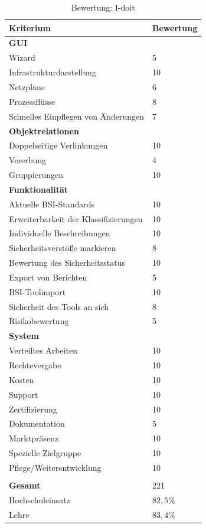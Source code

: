 \begin{table}[h]
\begin{tabular}{|p{}|p{}|}
\hline
Kriterium & Bewertung\\
\hline
\textbf{GUI}& \\
\hline
Wizard & 5 \\
\hline
Infrastrukturdarstellung & 10 \\
\hline
Netzpläne & 6 \\
\hline
Prozessflüsse & 8 \\
\hline
Schnelles Einpflegen von Änderungen & 7 \\
\hline
\textbf{Objektrelationen} &  \\
\hline
Doppelseitige Verlinkungen & 10 \\
\hline
Vererbung & 4 \\
\hline
Gruppierungen & 10 \\
\hline
\textbf{Funktionalität} &\\
\hline
Aktuelle BSI-Standards & 10 \\
\hline
Erweiterbarkeit der Klassifizierungen & 10 \\
\hline
Individuelle Beschreibungen & 10 \\
\hline
Sicherheitsverstöße markieren & 8 \\
\hline
Bewertung des Sicherheitsstatus & 10 \\
\hline
Export von Berichten & 5 \\
\hline
BSI-Toolimport & 10 \\
\hline
Sicherheit des Tools an sich & 8 \\
\hline
Risikobewertung & 5 \\
\hline
\textbf{System}& \\
\hline
Verteiltes Arbeiten & 10 \\
\hline
Rechtevergabe & 10 \\
\hline
Kosten & 10 \\
\hline
Support & 10 \\
\hline
Zertifizierung & 10 \\
\hline
Dokumentation & 5 \\
\hline
Marktpräsenz & 10 \\
\hline
Spezielle Zielgruppe & 10 \\
\hline
Pflege/Weiterentwicklung & 10 \\
\hline
\multicolumn{2}{c}{}\\
\hline
\textbf{Gesamt} & 221\\
\hline
Hochschuleinsatz & $82,5\%$\\
\hline
Lehre & $83,4\%$\\
\hline
\end{tabular}
\caption{Bewertung: I-doit}
\label{tab:BerwertungIdoit}
\end{table}



